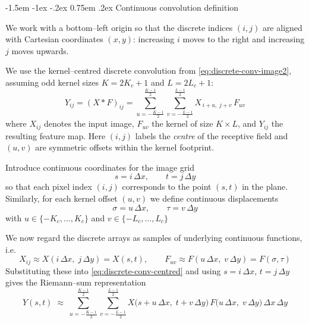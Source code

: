 \documentclass[12pt]{article}
\makeatletter
\renewcommand\subsection{\@startsection{subsection}{2}{\z@}%
                                     {-1.5em \@plus -1ex \@minus -.2ex}%
                                     {0.75em \@plus .2ex}%
                                     {\normalfont\large\bfseries}}
\makeatother
\begin{document}
  \subsection{Continuous convolution definition}

  We work with a bottom–left origin so that the discrete indices $(i,j)$ are
  aligned with Cartesian coordinates $(x,y)$: increasing $i$ moves to the right
  and increasing $j$ moves upwards.
  
  We use the kernel–centred discrete convolution from
  \eqref{eq:discrete-conv-image2}, assuming odd kernel sizes
  $K = 2K_c + 1$ and $L = 2L_c + 1$:
  \begin{equation}
    \label{eq:discrete-conv-centred}
    Y_{ij} = (X * F)_{ij}
    =
    \sum_{u = -\frac{K-1}{2}}^{\frac{K-1}{2}}
    \sum_{v = -\frac{L-1}{2}}^{\frac{L-1}{2}}
    X_{\,i+u,\; j+v}\, F_{uv}
  \end{equation}
  where $X_{ij}$ denotes the input image, $F_{uv}$ the kernel of size
  $K \times L$, and $Y_{ij}$ the resulting feature map.  Here $(i,j)$ labels
  the \emph{centre} of the receptive field and $(u,v)$ are symmetric offsets
  within the kernel footprint.
  
  Introduce continuous coordinates for the image grid
  \begin{equation}
    \label{eq:coord-map-centred}
    s = i\,\Delta x,\qquad t = j\,\Delta y
  \end{equation}
  so that each pixel index $(i,j)$ corresponds to the point $(s,t)$ in the
  plane.  Similarly, for each kernel offset $(u,v)$ we define continuous
  displacements
  \begin{equation}
    \label{eq:offset-map-centred}
    \sigma = u\,\Delta x,\qquad \tau = v\,\Delta y
  \end{equation}
  with $u \in \{-K_c,\dots,K_c\}$ and $v \in \{-L_c,\dots,L_c\}$
  
  We now regard the discrete arrays as samples of underlying continuous
  functions, i.e.
  \begin{equation}
    X_{ij} \approx X(i\,\Delta x,\; j\,\Delta y) = X(s,t),\qquad
    F_{uv} \approx F(u\,\Delta x,\; v\,\Delta y) = F(\sigma,\tau)
  \end{equation}
  Substituting these into \eqref{eq:discrete-conv-centred} and using
  $s = i\,\Delta x$, $t = j\,\Delta y$ gives the Riemann–sum representation
  \begin{equation}
    \label{eq:riemann-sum-centred}
    Y(s,t)
    \;\approx\;
    \sum_{u = -\frac{K-1}{2}}^{\frac{K-1}{2}}
    \sum_{v = -\frac{L-1}{2}}^{\frac{L-1}{2}}
    X\bigl(s + u\,\Delta x,\; t + v\,\Delta y\bigr)\,
    F\bigl(u\,\Delta x,\; v\,\Delta y\bigr)\,
    \Delta x\,\Delta y
  \end{equation}
  
\end{document}
